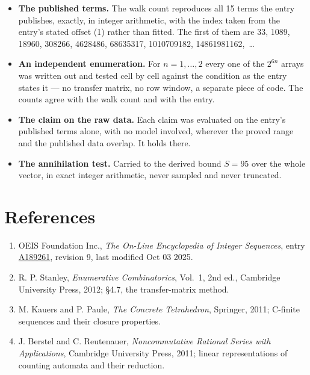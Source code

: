 \documentclass[11pt]{article}
\theoremstyle{definition}
\begin{document}
\begin{itemize}

\item {\bfseries The published terms.} The walk count reproduces all 15 terms the entry publishes, exactly, in integer arithmetic, with the index taken from the entry's stated offset (1) rather than fitted. The first of them are 33, 1089, 18960, 308266, 4628486, 68635317, 1010709182, 14861981162,~\dots

\item {\bfseries An independent enumeration.} For $n = 1,\dots,2$ every one of the $2^{6n}$ arrays was written out and tested cell by cell against the condition as the entry states it --- no transfer matrix, no row window, a separate piece of code. The counts agree with the walk count and with the entry.

\item {\bfseries The claim on the raw data.} Each claim was evaluated on the entry's published terms alone, with no model involved, wherever the proved range and the published data overlap. It holds there.

\item {\bfseries The annihilation test.} Carried to the derived bound $S = 95$ over the whole vector, in exact integer arithmetic, never sampled and never truncated.

\end{itemize}

\section{References}

\begin{enumerate}

\item OEIS Foundation Inc., \emph{The On-Line Encyclopedia of Integer Sequences}, entry \href{https://oeis.org/A189261}{A189261}, revision 9, last modified Oct 03 2025.

\item R. P. Stanley, \emph{Enumerative Combinatorics}, Vol.~1, 2nd ed., Cambridge University Press, 2012; \S4.7, the transfer-matrix method.

\item M. Kauers and P. Paule, \emph{The Concrete Tetrahedron}, Springer, 2011; C-finite sequences and their closure properties.

\item J. Berstel and C. Reutenauer, \emph{Noncommutative Rational Series with Applications}, Cambridge University Press, 2011; linear representations of counting automata and their reduction.

\end{enumerate}
\end{document}
